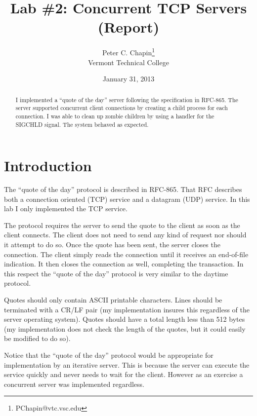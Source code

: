 \documentclass{article}
\begin{document}
\title{Lab \#2: Concurrent TCP Servers\\(Report)}
\author{Peter C. Chapin\thanks{PChapin@vtc.vsc.edu}\\
  Vermont Technical College}
\date{January 31, 2013}
\maketitle

\begin{abstract}
  I implemented a ``quote of the day'' server following the specification in RFC-865. The server
  supported concurrent client connections by creating a child process for each connection. I was
  able to clean up zombie children by using a handler for the SIGCHLD signal. The system behaved
  as expected.
\end{abstract}


\section{Introduction}
\label{sec:introduction}

The ``quote of the day'' protocol is described in RFC-865. That RFC describes both a connection
oriented (TCP) service and a datagram (UDP) service. In this lab I only implemented the TCP
service.

The protocol requires the server to send the quote to the client as soon as the client connects.
The client does not need to send any kind of request nor should it attempt to do so. Once the
quote has been sent, the server closes the connection. The client simply reads the connection
until it receives an end-of-file indication. It then closes the connection as well, completing
the transaction. In this respect the ``quote of the day'' protocol is very similar to the
daytime protocol.

Quotes should only contain ASCII printable characters. Lines should be terminated with a CR/LF
pair (my implementation insures this regardless of the server operating system). Quotes should
have a total length less than 512 bytes (my implementation does not check the length of the
quotes, but it could easily be modified to do so).

Notice that the ``quote of the day'' protocol would be appropriate for implementation by an
iterative server. This is because the server can execute the service quickly and never needs to
wait for the client. However as an exercise a concurrent server was implemented regardless.
\end{document}
